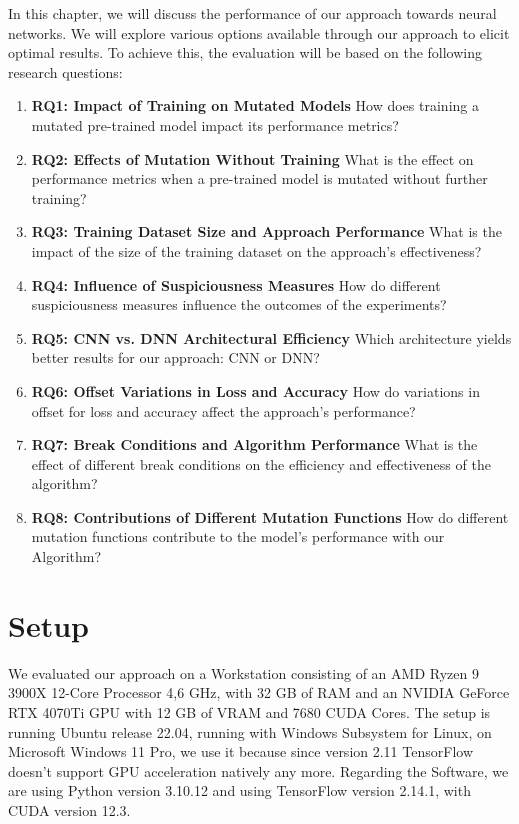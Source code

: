 In this chapter, we will discuss the performance of our approach towards neural networks.
We will explore various options available through our approach to elicit optimal results.
To achieve this, the evaluation will be based on the following research questions:
\begin{enumerate}
    \item[]\textbf{RQ1: Impact of Training on Mutated Models} How does training a mutated pre-trained model impact its performance metrics?
    \item[]\textbf{RQ2: Effects of Mutation Without Training} What is the effect on performance metrics when a pre-trained model is mutated without further training?
    \item[]\textbf{RQ3: Training Dataset Size and Approach Performance} What is the impact of the size of the training dataset on the approach's effectiveness?
    \item[]\textbf{RQ4: Influence of Suspiciousness Measures} How do different suspiciousness measures influence the outcomes of the experiments?
    \item[]\textbf{RQ5: CNN vs. DNN Architectural Efficiency} Which architecture yields better results for our approach: CNN or DNN?
    \item[]\textbf{RQ6: Offset Variations in Loss and Accuracy} How do variations in offset for loss and accuracy affect the approach's performance?
    \item[]\textbf{RQ7: Break Conditions and Algorithm Performance} What is the effect of different break conditions on the efficiency and effectiveness of the algorithm?
    \item[]\textbf{RQ8: Contributions of Different Mutation Functions} How do different mutation functions contribute to the model's performance with our Algorithm?
\end{enumerate}
\section{Setup}\label{sec:setup}

We evaluated our approach on a Workstation consisting of an AMD Ryzen 9 3900X 12-Core Processor 4,6 GHz, with 32 GB of RAM and an NVIDIA GeForce RTX 4070Ti GPU with 12 GB of VRAM and 7680 CUDA Cores.
The setup is running Ubuntu release 22.04, running with Windows Subsystem for Linux, on Microsoft Windows 11 Pro, we use it because since version 2.11\cite{noauthor_build_2023} TensorFlow doesn't support GPU acceleration natively any more.
Regarding the Software, we are using Python version 3.10.12 and using TensorFlow version 2.14.1, with CUDA version 12.3.

